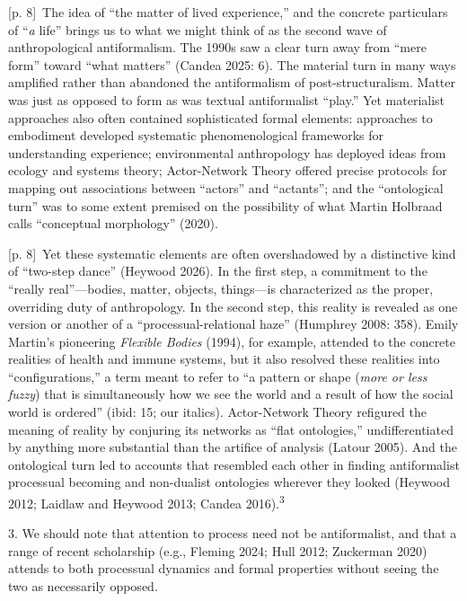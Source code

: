 \documentclass[10pt,a4paper]{article}
\begin{document}
{\scriptsize\color{gray} [p. 8]}\ The idea of “the matter of lived experience,” and the concrete particulars of “\textit{a} life” brings us to what we might think of as the second wave of anthropological antiformalism. The 1990s saw a clear turn away from “mere form” toward “what matters” (Candea 2025: 6). The material turn in many ways amplified rather than abandoned the antiformalism of post-structuralism. Matter was just as opposed to form as was textual antiformalist “play.” Yet materialist approaches also often contained sophisticated formal elements: approaches to embodiment developed systematic phenomenological frameworks for understanding experience; environmental anthropology has deployed ideas from ecology and systems theory; Actor-Network Theory offered precise protocols for mapping out associations between “actors” and “actants”; and the “ontological turn” was to some extent premised on the possibility of what Martin Holbraad calls “conceptual morphology” (2020).\par
{\scriptsize\color{gray} [p. 8]}\ Yet these systematic elements are often overshadowed by a distinctive kind of “two-step dance” (Heywood 2026). In the first step, a commitment to the “really real”—bodies, matter, objects, things—is characterized as the proper, overriding duty of anthropology. In the second step, this reality is revealed as one version or another of a “processual-relational haze” (Humphrey 2008: 358). Emily Martin’s pioneering \textit{Flexible Bodies} (1994), for example, attended to the concrete realities of health and immune systems, but it also resolved these realities into “configurations,” a term meant to refer to “a pattern or shape (\textit{more or less fuzzy}) that is simultaneously how we see the world and a result of how the social world is ordered” (ibid: 15; our italics). Actor-Network Theory refigured the meaning of reality by conjuring its networks as “flat ontologies,” undifferentiated by anything more substantial than the artifice of analysis (Latour 2005). And the ontological turn led to accounts that resembled each other in finding antiformalist processual becoming and non-dualist ontologies wherever they looked (Heywood 2012; Laidlaw and Heywood 2013; Candea 2016).\textsuperscript{3}\par{\small 3. We should note that attention to process need not be antiformalist, and that a range of recent scholarship (e.g., Fleming 2024; Hull 2012; Zuckerman 2020) attends to both processual dynamics and formal properties without seeing the two as necessarily opposed.\par}
\end{document}
